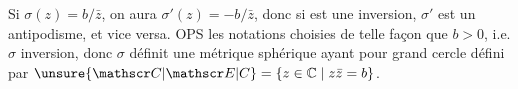 Si $\sigma(z)=b/\bar z$, on aura $\sigma'(z)=-b/\bar z$,  donc si  \inserted{$\sigma$} est une inversion, $\sigma'$ est un antipodisme, et vice versa. OPS les notations choisies de telle façon que $b>0$, i.e. $\sigma$ inversion, donc $\sigma$ définit une métrique sphérique ayant pour grand cercle défini par $\unsure{\mathscr C|\mathscr E|C}=\{z\in\mathbb C\mid z\bar z=b\}$.


